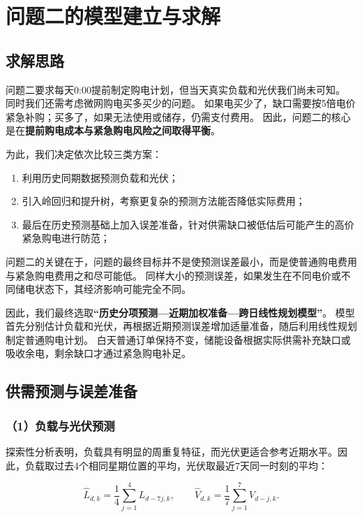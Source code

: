 \section{问题二的模型建立与求解}

\subsection{求解思路}

问题二要求每天0:00提前制定购电计划，但当天真实负载和光伏我们尚未可知。
同时我们还需考虑微网购电买多买少的问题。
如果电买少了，缺口需要按5倍电价紧急补购；买多了，如果无法使用或储存，仍需支付费用。
因此，问题二的核心是在\textbf{提前购电成本与紧急购电风险之间取得平衡}。

为此，我们决定依次比较三类方案：

\begin{enumerate}
    \item 利用历史同期数据预测负载和光伏；
    \item 引入岭回归和提升树，考察更复杂的预测方法能否降低实际费用；
    \item 最后在历史预测基础上加入误差准备，针对供需缺口被低估后可能产生的高价紧急购电进行防范；
\end{enumerate}

问题二的关键在于，问题的最终目标并不是使预测误差最小，而是使普通购电费用与紧急购电费用之和尽可能低。
同样大小的预测误差，如果发生在不同电价或不同储电状态下，其经济影响可能完全不同。

因此，我们最终选取\textbf{“历史分项预测—近期加权准备—跨日线性规划模型”}。
模型首先分别估计负载和光伏，再根据近期预测误差增加适量准备，随后利用线性规划制定普通购电计划。
白天普通订单保持不变，储能设备根据实际供需补充缺口或吸收余电，剩余缺口才通过紧急购电补足。


\subsection{供需预测与误差准备}

\subsubsection*{（1）负载与光伏预测}

探索性分析表明，负载具有明显的周重复特征，而光伏更适合参考近期水平。因此，负载取过去4个相同星期位置的平均，光伏取最近7天同一时刻的平均：

\begin{equation}
\widehat L_{d,k}
=
\frac{1}{4}\sum_{j=1}^{4}L_{d-7j,k},
\qquad
\widehat V_{d,k}
=
\frac{1}{7}\sum_{j=1}^{7}V_{d-j,k}.
\end{equation}


